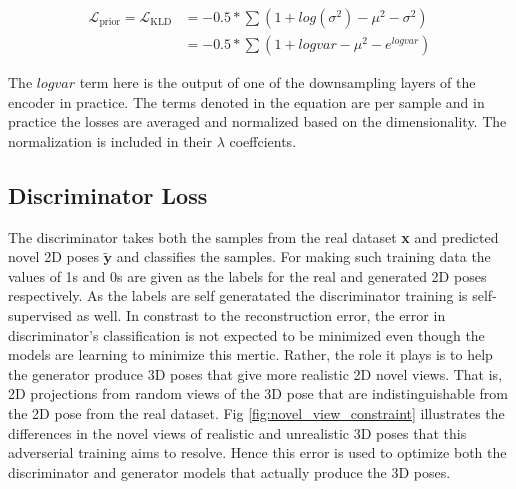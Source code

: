 \begin{equation} \label{loss_kld}
    \begin{split}
        \mathcal{L}_{\text {prior}} = \mathcal{L}_{\text {KLD}} &= -0.5 * \sum (1 + log(\sigma^2) - \mu^2 - \sigma^2) \\
        &= -0.5 * \sum (1 + logvar - \mu^2 - e^{logvar})
    \end{split}
\end{equation}

The $logvar$ term here is the output of one of the downsampling layers of the encoder in practice. The terms denoted in the equation are per sample and in practice the losses are averaged and normalized based on the dimensionality. The normalization is included in their $\lambda$ coeffcients.

\subsection{Discriminator Loss}

The discriminator takes both the samples from the real dataset \textbf{x} and predicted novel 2D poses $\tilde{\textbf{y}}$ and classifies the samples. For making such training data the values of 1s and 0s are given as the labels for the real and generated 2D poses respectively. As the labels are self generatated the discriminator training is self-supervised as well. In constrast to the reconstruction error, the error in discriminator's classification is not expected to be minimized even though the models are learning to minimize this mertic. Rather, the role it plays is to help the generator produce 3D poses that give more realistic 2D novel views. That is, 2D projections from random views of the 3D pose that are indistinguishable from the 2D pose from the real dataset. Fig \ref{fig:novel_view_constraint} illustrates the differences in the novel views of realistic and unrealistic 3D poses that this adverserial training aims to resolve. Hence this error is used to optimize both the discriminator and generator models that actually produce the 3D poses.

